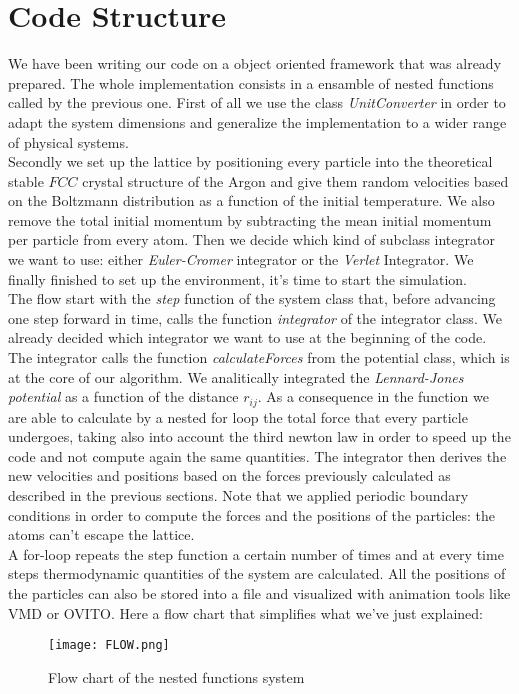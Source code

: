 \documentclass[10pt,a4paper,titlepage]{article}
\begin{document}
\newpage
\section*{Code Structure}
\noindent We have been writing our code on a object oriented framework that was already prepared. The whole implementation consists in a ensamble of nested functions called by the previous one. 
First of all we use the class \textit{UnitConverter} in order to adapt the system dimensions and generalize the implementation to a wider range of physical systems.
\\
Secondly we set up the lattice by positioning every particle into the theoretical stable $FCC$ crystal structure of the Argon and give them random velocities based on the Boltzmann distribution as a function of the initial temperature. We also remove the total initial momentum by subtracting the mean initial momentum per particle from every atom.
Then we decide which kind of subclass integrator we want to use: either \textit{Euler-Cromer} integrator or the \textit{Verlet} Integrator.
We finally finished to set up the environment, it's time to start the simulation.
\\ \newline
The flow start with the \textit{step} function of the system class that, before advancing one step forward in time, calls the function \textit{integrator} of the integrator class. We already decided which integrator we want to use at the  beginning of the code. The integrator calls the function \textit{calculateForces} from the potential class, which is at the  core of our algorithm. We analitically integrated the \textit{Lennard-Jones potential} as a function of the distance $r_{ij}$. As a consequence in the function we are able to calculate by a nested for loop the total force that every particle undergoes, taking also into account the third newton law in order to speed up the code and not compute again the same quantities.
The integrator then derives the new velocities and positions based on the forces previously calculated as described in the previous sections. Note that we applied periodic boundary conditions in order to compute the forces and the positions of the particles: the atoms can't escape the lattice.
\\ \newline
A for-loop repeats the step function a certain number of times and at every time steps thermodynamic quantities of the system are calculated. All the positions of the particles can also be stored into a file and visualized with animation tools like VMD or OVITO. Here a flow chart that simplifies what we've just explained:
\begin{figure}[H]
\begin{center}
    \texttt{[image: FLOW.png]}
\caption{Flow chart of the nested functions system}
	\end{center}
\end{figure}
\newpage
\end{document}
